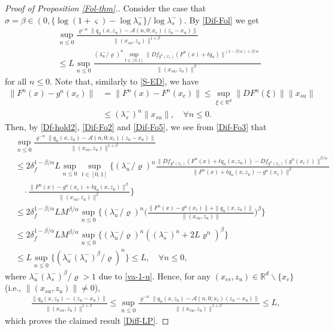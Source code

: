 \documentclass[reqno]{amsart}
\numberwithin{equation}{section}
\begin{document}
\begin{proof}[Proof of Proposition {\rm \ref{Fol-thm}.}]
Consider the case that $\sigma =\beta \in (0,\{\log(1+\varsigma)-\log\lambda_u^-\}/\log\lambda_s^-)$.  By \eqref{Dif-Fol} we get
\begin{align}\label{Dif-Fo3}
& \sup_{n\le 0}  \frac{\varrho^{-n}\|q_n(x,z_u)-\mathcal{A}(n,0;x_c)(z_u-x_u)\|}{\|(x_{su},z_u)\|^{1+\beta}}
\nonumber\\
&\le L \sup_{n\le 0}  \frac{(\lambda_u^-/\varrho)^n \sup_{t\in[0,1]} \big\| Df_{g^n(x_c)}(F^n(x)+t q_n) \big\|^{(1-\beta/\alpha)+\beta/\alpha} }{\|(x_{su},z_u)\|^{\beta}}
\end{align}
for all $n\le 0$.
Note that, similarly to \eqref{S-ED}, we have
\begin{align}\label{Dif-Fo5}
\|F^n(x)-g^n(x_c)\|
&= \|F^n(x)-F^n(x_c)\|
\le \sup_{\xi\in \mathbb{R}^d} \|DF^n(\xi)\| \|x_{su}\|
\nonumber\\
&\le (\lambda_s^-)^{n} \|x_{su}\|,\quad \forall n\le 0.
\end{align}
Then, by \eqref{Df-hold2}, \eqref{Dif-Fo2} %
and \eqref{Dif-Fo5}, we see from \eqref{Dif-Fo3} that
\begin{align}\label{qq-AA}
& \sup_{n\le 0}  \frac{\varrho^{-n}\|q_n(x,z_u)-\mathcal{A}(n,0;x_c)(z_u-x_u)\|}{\|(x_{su},z_u)\|^{1+\beta}}
\nonumber\\
&\le 2\delta_f^{1-\beta/\alpha} L \sup_{n\le 0}\sup_{t\in[0,1]}\Bigg\{(\lambda_u^-/\varrho)^n
\frac{ \big\| Df_{g^n(x_c)}(F^n(x)+t q_n(x,z_u))-Df_{g^n(x_c)}(g^n(x_c)) \big\|^{\beta/\alpha} }{\big\|F^n(x)+tq_n(x,z_u)- g^n(x_c)\big\|^{\beta}}
\nonumber\\
&\quad \cdot
 \frac{\big\|F^n(x)-g^n(x_c)+tq_n(x,z_u) \big\|^{\beta}}{\|(x_{su},z_u)\|^{\beta}}\Bigg\}
\nonumber\\
& \le 2\delta_f^{1-\beta/\alpha} L M^{\beta/\alpha}
 \sup_{n\le 0}\bigg\{(\lambda_u^-/\varrho)^n  \bigg(\frac{\|F^n(x)-g^n(x_c)\|+\|q_n(x,z_u)\|}{\|(x_{su},z_u)\|}\bigg)^{\beta}\bigg\}
\nonumber\\
& \le 2\delta_f^{1-\beta/\alpha} L M^{\beta/\alpha} \sup_{n\le 0}\{(\lambda_u^-/\varrho)^n
( (\lambda_s^-)^n + 2L\varrho^n )^{\beta}\}
\nonumber\\
&\le L \sup_{n\le 0}\{(\lambda_u^-(\lambda_s^-)^\beta/\varrho)^n\} \le L, \quad \forall n\le 0,
\end{align}
where $ \lambda_u^-(\lambda_s^-)^\beta/\varrho >1$
due to \eqref{va-1-u}. Hence, for any $(x_{cs},z_u)\in \mathbb{R}^d\backslash\{x_c\}$ (i.e., $\|(x_{su},z_u)\|\ne 0$),
\begin{align*}
\frac{\|q_0(x,z_u)-  (z_u-x_u)\|}{\|(x_{su},z_u)\|^{1+\beta}}
 \le \sup_{n\le 0}  \frac{\varrho^{-n}\|q_n(x,z_u)-\mathcal{A}(n,0;x_c)(z_u-x_u)\|}{\|(x_{su},z_u)\|^{1+\beta}} \le L,
\end{align*}
which proves the claimed result \eqref{Diff-LP}.



\end{proof}
\end{document}
